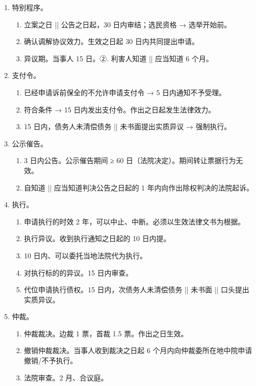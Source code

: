 \begin{enumerate}
\begin{enumerate}
          \item 同一审。
        \end{enumerate}
  \item 特别程序。
        \begin{enumerate}
          \item 立案之日 || 公告之日起，30 日内审结；选民资格 → 选举开始前。
          \item 确认调解协议效力。生效之日起 30 日内共同提出申请。
          \item 异议期。当事人 15 日。②. 利害人知道 || 应当知道 6 个月。
        \end{enumerate}
  \item 支付令。
        \begin{enumerate}
          \item 已经申请诉前保全的不允许申请支付令 → 5 日内通知不予受理。
          \item 符合条件 → 15 日内发出支付令。作出之日起发生法律效力。
          \item 15 日内，债务人未清偿债务 || 未书面提出实质异议 → 强制执行。
        \end{enumerate}
  \item 公示催告。
        \begin{enumerate}
          \item 3 日内公告。公示催告期间 ≥ 60 日（法院决定）。期间转让票据行为无效。
          \item 自知道 || 应当知道判决公告之日起的 1 年内向作出除权判决的法院起诉。
        \end{enumerate}
  \item 执行。
        \begin{enumerate}
          \item 申请执行的时效 2 年，可以中止、中断。必须以生效法律文书为根据。
          \item 执行异议。收到执行通知之日起的 10 日内提。
          \item 10 日内、可以委托当地法院代为执行。
          \item 对执行标的的异议。15 日内审查。
          \item 代位申请执行债权。15 日内，次债务人未清偿债务 || 未书面 || 口头提出实质异议。
        \end{enumerate}
  \item 仲裁。
        \begin{enumerate}
          \item 仲裁裁决。边裁 1 票，首裁 1.5 票。作出之日生效。
          \item 撤销仲裁裁决。当事人收到裁决之日起 6 个月内向仲裁委所在地中院申请撤销/不予执行。
          \item 法院审查。2 月、合议庭。
        \end{enumerate}
\end{enumerate}

